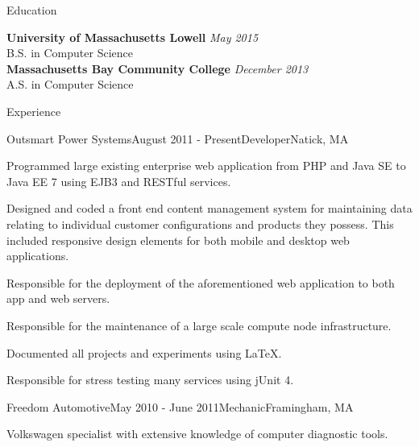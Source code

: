 \documentclass{resume} %
\begin{document}

\begin{rSection}{Education}

{\bf University of Massachusetts Lowell} \hfill {\em May 2015} \\ 
B.S. in Computer Science  \smallskip \\
{\bf Massachusetts Bay Community College} \hfill {\em December 2013} \\ 
A.S. in Computer Science  \smallskip \\

\end{rSection}


\begin{rSection}{Experience}


\begin{rSubsection}{Outsmart Power Systems}{August 2011 - Present}{Developer}{Natick, MA}
\item Programmed large existing enterprise web application from PHP and Java SE to Java EE 7 using EJB3 and RESTful services.
\item Designed and coded a front end content management system for maintaining data relating to individual customer configurations and products they possess. This included responsive design elements for both mobile and desktop web applications.
\item Responsible for the deployment of the aforementioned web application to both app and web servers.
\item Responsible for the maintenance of a large scale compute node infrastructure.
\item Documented all projects and experiments using \LaTeX.
\item Responsible for stress testing many services using jUnit 4.
\end{rSubsection}


\begin{rSubsection}{Freedom Automotive}{May 2010 - June 2011}{Mechanic}{Framingham, MA}
\item Volkswagen specialist with extensive knowledge of computer diagnostic tools.
\end{rSubsection}


\end{rSection}
\end{document}
